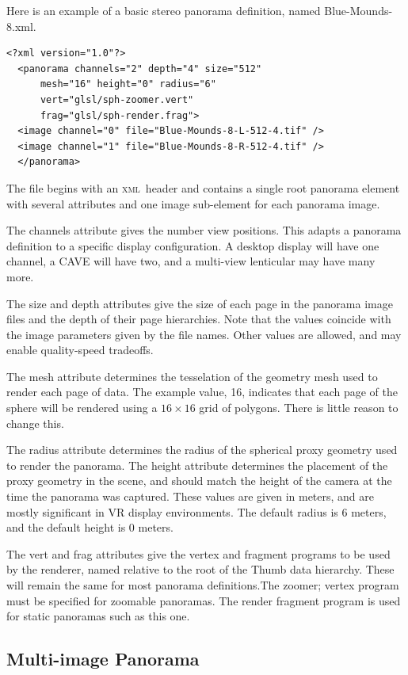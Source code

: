 \documentclass[oneside,11pt]{memoir}
\newcommand{\xml}     {\textsc{xml}}
\begin{document}
\begin{Spacing}{1.1}
Here is an example of a basic stereo panorama definition, named Blue-Mounds-8.xml.

\begin{verbatim}
<?xml version="1.0"?>
  <panorama channels="2" depth="4" size="512"
      mesh="16" height="0" radius="6"
      vert="glsl/sph-zoomer.vert"
      frag="glsl/sph-render.frag">
  <image channel="0" file="Blue-Mounds-8-L-512-4.tif" />
  <image channel="1" file="Blue-Mounds-8-R-512-4.tif" />
  </panorama>
\end{verbatim}

The file begins with an \xml\ header and contains a single root panorama element with several attributes and one image sub-element for each panorama image.

The channels attribute gives the number view positions. This adapts a panorama definition to a specific display configuration. A desktop display will have one channel, a CAVE will have two, and a multi-view lenticular may have many more.

The size and depth attributes give the size of each page in the panorama image files and the depth of their page hierarchies. Note that the values coincide with the image parameters given by the file names. Other values are allowed, and may enable quality-speed tradeoffs.

The mesh attribute determines the tesselation of the geometry mesh used to render each page of data. The example value, 16, indicates that each page of the sphere will be rendered using a $16\times 16$ grid of polygons. There is little reason to change this.

The radius attribute determines the radius of the spherical proxy geometry used to render the panorama. The height attribute determines the placement of the proxy geometry in the scene, and should match the height of the camera at the time the panorama was captured. These values are given in meters, and are mostly significant in VR display environments. The default radius is 6 meters, and the default height is 0 meters.

The vert and frag attributes give the vertex and fragment programs to be used by the renderer, named relative to the root of the Thumb data hierarchy. These will remain the same for most panorama definitions.The zoomer; vertex program must be specified for zoomable panoramas. The render fragment program is used for static panoramas such as this one.

\subsection{Multi-image Panorama}


\end{Spacing}
\end{document}
